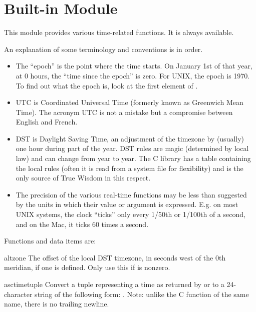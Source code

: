\section{Built-in Module }

This module provides various time-related functions.
It is always available.

An explanation of some terminology and conventions is in order.

\begin{itemize}

\item
The ``epoch'' is the point where the time starts.  On January 1st of that
year, at 0 hours, the ``time since the epoch'' is zero.  For UNIX, the
epoch is 1970.  To find out what the epoch is, look at the first
element of .

\item
UTC is Coordinated Universal Time (formerly known as Greenwich Mean
Time).  The acronym UTC is not a mistake but a compromise between
English and French.

\item
DST is Daylight Saving Time, an adjustment of the timezone by
(usually) one hour during part of the year.  DST rules are magic
(determined by local law) and can change from year to year.  The C
library has a table containing the local rules (often it is read from
a system file for flexibility) and is the only source of True Wisdom
in this respect.

\item
The precision of the various real-time functions may be less than
suggested by the units in which their value or argument is expressed.
E.g. on most UNIX systems, the clock ``ticks'' only every 1/50th or
1/100th of a second, and on the Mac, it ticks 60 times a second.

\end{itemize}

Functions and data items are:

\renewcommand{\indexsubitem}{(in module time)}

\begin{datadesc}{altzone}
The offset of the local DST timezone, in seconds west of the 0th
meridian, if one is defined.  Only use this if  is
nonzero.
\end{datadesc}


\begin{funcdesc}{asctime}{tuple}
Convert a tuple representing a time as returned by  or
 to a 24-character string of the following form:
.  Note: unlike the C function of
the same name, there is no trailing newline.
\end{funcdesc}


